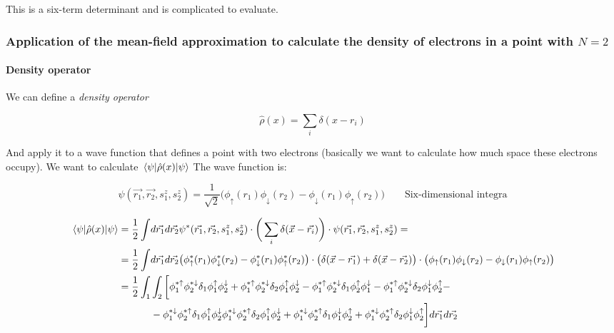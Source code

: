 		This is a six-term determinant and is complicated to evaluate.


		\subsubsection{Application of the mean-field approximation to calculate the density of electrons in a point with $N=2$}

			\paragraph{Density operator}
			We can define a \textit{density operator}

			$$\hat{\rho}(x)=\sum_i\delta(x-r_i)$$

			And apply it to a wave function that defines a point with two electrons (basically we want to calculate how much space these electrons occupy).
			We want to calculate $\mel{\psi}{\hat{\rho}(x)}{\psi}$
			The wave function is:

			$$\psi(\vec{r_1},\vec{r_2},s_1^z,s_2^z)=\frac{1}{\sqrt{2}}\big(\phi_\uparrow(r_1)\phi_\downarrow(r_2)-\phi_\downarrow(r_1)\phi_\uparrow(r_2)\big)\qquad\text{Six-dimensional integra}$$


			\begin{align*}
				\mel{\psi}{\hat{\rho}(x)}{\psi}=\frac{1}{2}\int &d\vec{r_1}d\vec{r_2} \psi^*(\vec{r_1},\vec{r_2},s_1^z,s_2^z)\cdot\bigg(\sum_i \delta(\vec{x}-\vec{r_i})\bigg)\cdot\psi(\vec{r_1},\vec{r_2},s_1^z,s_2^z)=\\
				=\frac{1}{2}\int &d\vec{r_1}d\vec{r_2}\big(\phi^*_\uparrow(r_1)\phi^*_\downarrow(r_2)-\phi^*_\downarrow(r_1)\phi^*_\uparrow(r_2)\big)\cdot\big(\delta(\vec{x}-\vec{r_1})+\delta(\vec{x}-\vec{r_2})\big)\cdot\big(\phi_\uparrow(r_1)\phi_\downarrow(r_2)-\phi_\downarrow(r_1)\phi_\uparrow(r_2)\big)\\
				=\frac{1}{2}\int_1&\int_2\bigg[\phi_1^{*\uparrow}\phi_2^{*\downarrow}\delta_1\phi_1^\uparrow\phi_2^\downarrow+\phi_1^{*\uparrow}\phi_2^{*\downarrow}\delta_2\phi_1^\uparrow\phi_2^\downarrow-\phi_1^{*\uparrow}\phi_2^{*\downarrow}\delta_1\phi_2^\uparrow\phi_1^\downarrow-\phi_1^{*\uparrow}\phi_2^{*\downarrow}\delta_2\phi_1^\downarrow\phi_2^\uparrow-\\
													&-\phi_1^{*\downarrow}\phi_2^{*\uparrow}\delta_1\phi_1^\uparrow\phi_2^\downarrow\phi_1^{*\downarrow}\phi_2^{*\uparrow}\delta_2\phi_1^\uparrow\phi_2^\downarrow+\phi_1^{*\downarrow}\phi_2^{*\uparrow}\delta_1\phi_1^\downarrow\phi_2^\uparrow+\phi_1^{*\downarrow}\phi_2^{*\uparrow}\delta_2\phi_1^\downarrow\phi_2^\uparrow\bigg]d\vec{r_1}d\vec{r_2}
			\end{align*}

